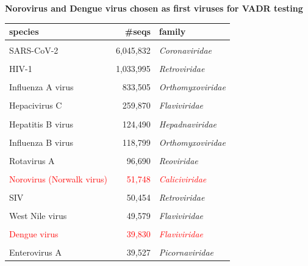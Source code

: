 \documentclass[landscape]{slides}
\begin{document}
\begin{slide}
\begin{center}

\textbf{Norovirus and Dengue virus chosen as first viruses for VADR testing}

\tiny
\begin{tabular}{lrl}
species                   &       \#seqs & family           \\ \hline
& & \\
SARS-CoV-2                &     6,045,832& \emph{Coronaviridae}    \\ %
& & \\
HIV-1                     &     1,033,995& \emph{Retroviridae}     \\ %
& & \\
Influenza A virus         &      833,505 & \emph{Orthomyxoviridae} \\ %
& & \\
Hepacivirus C             &      259,870 & \emph{Flaviviridae}     \\ %
& & \\
Hepatitis B virus         &      124,490 & \emph{Hepadnaviridae}   \\ %
& & \\
Influenza B virus         &      118,799 & \emph{Orthomyxoviridae} \\ %
& & \\
Rotavirus A               &       96,690 & \emph{Reoviridae}       \\ %
& & \\
\textcolor{red}{Norovirus (Norwalk virus)} &       \textcolor{red}{51,748} & \textcolor{red}{\emph{Caliciviridae}}    \\ %
& & \\
SIV                       &       50,454 & \emph{Retroviridae}     \\ %
& & \\
West Nile virus           &       49,579 & \emph{Flaviviridae}     \\ %
& & \\
\textcolor{red}{Dengue virus}              &       \textcolor{red}{39,830} & \textcolor{red}{\emph{Flaviviridae}}     \\ %
& & \\
Enterovirus A             &       39,527 & \emph{Picornaviridae}   \\ %

\end{tabular}
\end{center}
\end{slide}
\end{document}
